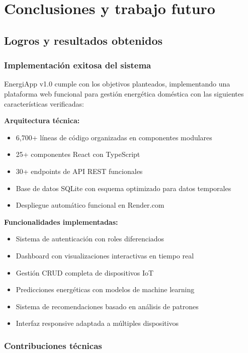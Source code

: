\chapter{Conclusiones y trabajo futuro}
\label{ch:conclusiones}

\section{Logros y resultados obtenidos}

\subsection{Implementación exitosa del sistema}

EnergiApp v1.0 cumple con los objetivos planteados, implementando una plataforma web funcional para gestión energética doméstica con las siguientes características verificadas:

\textbf{Arquitectura técnica:}
\begin{itemize}
    \item 6,700+ líneas de código organizadas en componentes modulares
    \item 25+ componentes React con TypeScript
    \item 30+ endpoints de API REST funcionales
    \item Base de datos SQLite con esquema optimizado para datos temporales
    \item Despliegue automático funcional en Render.com
\end{itemize}

\textbf{Funcionalidades implementadas:}
\begin{itemize}
    \item Sistema de autenticación con roles diferenciados
    \item Dashboard con visualizaciones interactivas en tiempo real
    \item Gestión CRUD completa de dispositivos IoT
    \item Predicciones energéticas con modelos de machine learning
    \item Sistema de recomendaciones basado en análisis de patrones
    \item Interfaz responsive adaptada a múltiples dispositivos
\end{itemize}

\subsection{Contribuciones técnicas}

